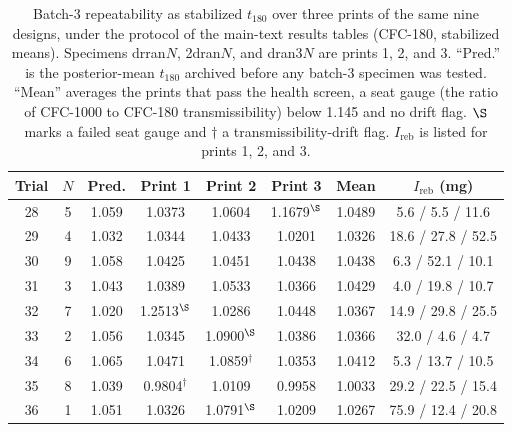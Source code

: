 \documentclass[11pt]{article}
\begin{document}
\begin{table}[ht]
  \centering
  \caption{Batch-3 repeatability as stabilized $t_{180}$ over three
    prints of the same nine designs, under the protocol of
    the main-text results tables (CFC-180, stabilized means). Specimens drran$N$, 2dran$N$, and
    dran3$N$ are prints 1, 2, and 3. ``Pred.'' is the posterior-mean
    $t_{180}$ archived before any batch-3 specimen was tested. ``Mean''
    averages the prints that pass the health screen, a seat gauge (the
    ratio of CFC-1000 to CFC-180 transmissibility) below 1.145 and no
    drift flag. $\S$ marks a failed seat gauge and $\dagger$ a
    transmissibility-drift flag. $I_{\mathrm{reb}}$ is listed for
    prints 1, 2, and 3.}
  \label{tab:si-round3-repeatability}
  \small
  \begin{tabular}{@{}cccccccc@{}}
    \toprule
    Trial & $N$ & Pred. & Print 1 & Print 2 & Print 3 & Mean &
    $I_{\mathrm{reb}}$ (mg) \\
    \midrule
    28 & 5 & 1.059 & 1.0373 & 1.0604 & 1.1679$^{\S}$ & 1.0489 & 5.6 / 5.5 / 11.6 \\
    29 & 4 & 1.032 & 1.0344 & 1.0433 & 1.0201 & 1.0326 & 18.6 / 27.8 / 52.5 \\
    30 & 9 & 1.058 & 1.0425 & 1.0451 & 1.0438 & 1.0438 & 6.3 / 52.1 / 10.1 \\
    31 & 3 & 1.043 & 1.0389 & 1.0533 & 1.0366 & 1.0429 & 4.0 / 19.8 / 10.7 \\
    32 & 7 & 1.020 & 1.2513$^{\S}$ & 1.0286 & 1.0448 & 1.0367 & 14.9 / 29.8 / 25.5 \\
    33 & 2 & 1.056 & 1.0345 & 1.0900$^{\S}$ & 1.0386 & 1.0366 & 32.0 / 4.6 / 4.7 \\
    34 & 6 & 1.065 & 1.0471 & 1.0859$^{\dagger}$ & 1.0353 & 1.0412 & 5.3 / 13.7 / 10.5 \\
    35 & 8 & 1.039 & 0.9804$^{\dagger}$ & 1.0109 & 0.9958 & 1.0033 & 29.2 / 22.5 / 15.4 \\
    36 & 1 & 1.051 & 1.0326 & 1.0791$^{\S}$ & 1.0209 & 1.0267 & 75.9 / 12.4 / 20.8 \\
    \bottomrule
  \end{tabular}
\end{table}

\end{document}
